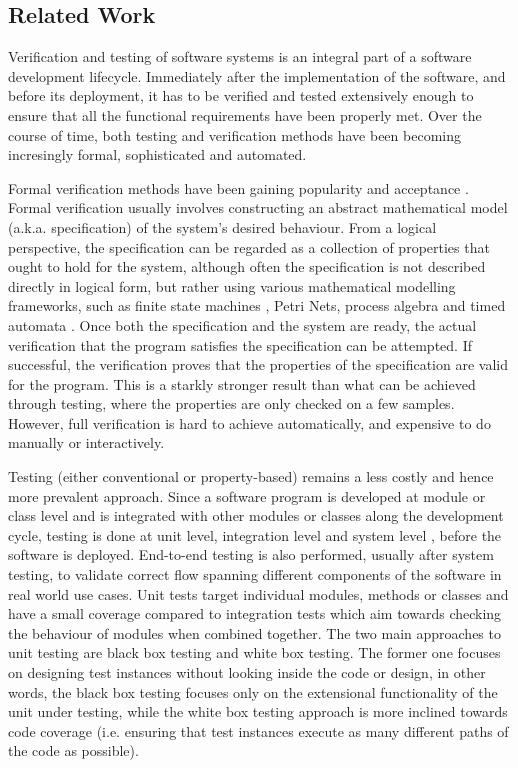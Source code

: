 \raggedbottom
\subsection{Related Work}

Verification and testing of software systems \cite{myers2011art} is an integral part of a software development lifecycle. Immediately after the implementation of the software, and before its deployment, it has to be verified and tested extensively enough to ensure that all the functional requirements have been properly met. Over the course of time, both testing and verification methods have been becoming incresingly formal, sophisticated and automated. 

Formal verification methods \cite{wang2004formal} have been gaining popularity and acceptance \cite{LiquidHaskell,Stainless,Coq}. Formal verification usually involves constructing an abstract mathematical model (a.k.a. specification) of the system's desired behaviour. From a logical perspective, the specification can be regarded as a collection of properties that ought to hold for the system, although often the specification is not described directly in logical form, but rather using various mathematical modelling frameworks, such as finite state machines \cite{chow1978testing}, Petri Nets, process algebra and timed automata \cite{clarke1996formal}. Once both the specification and the system are ready, the actual verification that the program satisfies the specification can be attempted. If successful, the verification proves that the properties of the specification are valid for the program. This is a starkly stronger result than what can be achieved through testing, where the properties are only checked on a few samples. However, full verification is hard to achieve automatically, and expensive to do manually or interactively.

Testing (either conventional or property-based) remains a less costly and hence more prevalent approach. Since a software program is developed at module or class level and is integrated with other modules or classes along the development cycle, testing is done at unit level, integration level and system level \cite{myers2011art}, before the software is deployed. End-to-end testing \cite{tsai2001end} is also performed, usually after system testing,%
to validate correct flow spanning different components of the software in real world use cases. Unit tests target individual modules, methods or classes and have a small coverage compared to integration tests which aim towards checking the behaviour of modules when combined together. The two main approaches to unit testing are black box testing and white box testing. The former one focuses on designing test instances without looking inside the code or design, in other words, the black box testing focuses only on the extensional functionality of the unit under testing, while the white box testing approach is more inclined towards code coverage (i.e. ensuring that test instances execute as many different paths of the code as possible).

